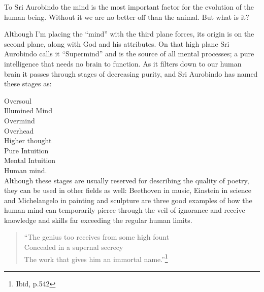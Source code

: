 \documentclass[12pt,a4paper]{book}
\begin{document}
To Sri Aurobindo the mind is the most important factor for the
evolution of the human being. Without it we are no better off than the
animal. But what is it?

Although I'm placing the ``mind'' with the third plane forces, its
origin is on the second plane, along with God and his attributes. On
that high plane Sri Aurobindo calls it ``Supermind'' and is the source
of all mental processes; a pure intelligence that needs no brain to
function. As it filters down to our human brain it passes through
stages of decreasing purity, and Sri Aurobindo has named these stages
as:

\noindent Oversoul\\
Illumined Mind\\
Overmind\\
Overhead\\
Higher thought\\
Pure Intuition\\
Mental Intuition\\
Human mind.\\


Although these stages are usually reserved for describing the quality
of poetry, they can be used in other fields as well: Beethoven in
music, Einstein in science and Michelangelo in painting and sculpture
are three good examples of how the human mind can temporarily pierce
through the veil of ignorance and receive knowledge and skills far
exceeding the regular human limits.

\begin{verse}
``The genius too receives from some high fount\\
Concealed in a supernal secrecy\\
The work that gives him an immortal name.''\footnote{Ibid, p.542}
\end{verse}
\end{document}
